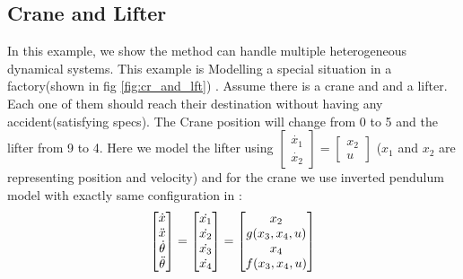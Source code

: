 
\subsection{Crane and Lifter}
In this example, we show the method can handle multiple heterogeneous dynamical systems. This example is Modelling a special situation in a factory(shown in fig \ref{fig:cr_and_lft}) . Assume there is a crane and and a lifter. Each one of them should reach their destination without having any accident(satisfying specs). The Crane position will change from 0 to 5 and the lifter from 9 to 4.  Here we model the lifter using $\begin{bmatrix} \dot{x_1}\\ \dot{x_2} \end{bmatrix}=\begin{bmatrix} x_2\\ u \end{bmatrix}$ ($x_1$ and $x_2$ are representing position and velocity) and for the crane we use inverted pendulum model with exactly same configuration in \cite{barto1983neuronlike}: \\ 
\[\begin{bmatrix}
\dot{x}\\
\Ddot{x}\\
\dot{\theta}\\
\Ddot{\theta}
\end{bmatrix}=\begin{bmatrix}
\dot{x_1}\\
\dot{x_2}\\
\dot{x_3}\\
\dot{x_4}
\end{bmatrix}=\begin{bmatrix}
x_2\\
g(x_3,x_4,u)\\
x_4\\
f(x_3,x_4,u)\\
\end{bmatrix}\]

